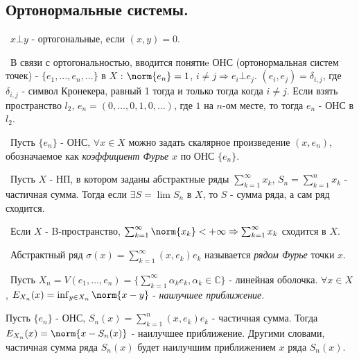 \subsection*{Ортонормальные системы.}

\noindent \textasteriskcentered~$x \bot y$ - ортогональные, если $(x, y) = 0$.

\smallskip
\noindent \textbullet~В связи с ортогональностью, вводится понятиe ОНС (ортонормальная систем точек) - $\{ e_1, \dots, e_n, \dots \}$ в $X$ : $\norm{e_n} = 1$, $i \neq 
j \Rightarrow e_i \bot e_j$. $(e_i, e_j) = \delta_{i, j}$, где $\delta_{i, j}$ - символ Кронекера, равный 1 тогда и только тогда когда $i \neq j$. Если взять пространство $l_2$, $e_n = (0, \dots, 0, 1, 0, \dots)$, где $1$ на $n$-ом месте, то тогда ${e_n}$ - ОНС в $l_2$.

\smallskip 
\noindent \textasteriskcentered~Пусть $\{e_n\}$ - ОНС, $\forall x \in X$ можно задать скалярное произведение $(x, e_n)$, обозначаемое как \textit{коэффициент Фурье} 
$x$ по ОНС $\{e_n\}$.

\smallskip 
\noindent \textbullet~Пусть $X$ - НП, в котором заданы абстрактные ряды $\sum_{k = 1}^\infty x_k$, $S_n = \sum_{k = 1}^n x_k$ - частичная сумма.
Тогда если $\exists S = \lim S_n$ в $X$, то $S$ - сумма ряда, а сам ряд сходится.

\medskip
\noindent \textbullet~Если $X$ - B-пространство, $\sum_{k = 1}^\infty \norm{x_k} < +\infty \Rightarrow \sum_{k = 1}^\infty x_k$ сходится в $X$.

\medskip 
\noindent \textasteriskcentered~Абстрактный ряд $\sigma(x) = \sum_{k = 1}^\infty (x, e_k) e_k$ называется \textit{рядом Фурье} точки $x$.

\medskip 
\noindent \textasteriskcentered~Пусть $X_n = V(e_1, \dots, e_n) = \{\sum_{k = 1}^\infty \alpha_k e_k, \alpha_k \in \mathbb{C} \}$ - линейная оболочка. $\forall x \in X$, 
$E_{X_n}(x) = \inf_{y \in X_n}\norm{x - y}$ - \textit{наилучшее приближение}.

\begin{theorem*}
Пусть $\{ e_n \}$ - ОНС, $S_n(x) = \sum_{k = 1}^n (x, e_k) e_k$ - частичная сумма. Тогда $E_{X_n}(x) = \norm{x - S_n(x)}$ - наилучшее приближение. Другими словами,
частичная сумма ряда $S_n(x)$ будет наилучшим приближением $x$ ряда $S_n(x)$.
\end{theorem*}

